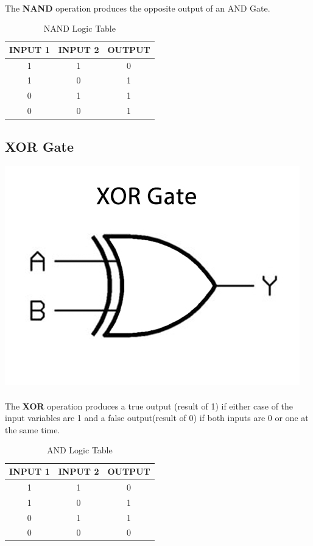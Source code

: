 \documentclass{article}
\begin{document}
\paragraph{}
The \textbf{NAND} operation produces the opposite output of an AND Gate.
\begin{table}[h]
	\centering
	\label{tab:table5}
	\caption{NAND Logic Table}
	\begin{tabular}{|c|c|c|}
		INPUT 1 & INPUT 2 & OUTPUT\\
		\hline
		1&1&0\\
		1&0&1\\
		0&1&1\\
		0&0&1\\
	\end{tabular}
\end{table}

\newpage
\subsection{XOR Gate}
\includegraphics[width=0.8\linewidth]{xor}
\paragraph{}
The \textbf{XOR} operation produces a true output (result of 1) if either case of the input variables are 1 and a false output(result of 0) if both inputs are 0 or one at the same time.
\begin{table}[h]
	\centering
	\label{tab:table6}
	\caption{AND Logic Table}
	\begin{tabular}{|c|c|c|}
		INPUT 1 & INPUT 2 & OUTPUT\\
		\hline
		1&1&0\\
		1&0&1\\
		0&1&1\\
		0&0&0\\
	\end{tabular}
\end{table}
\end{document}
